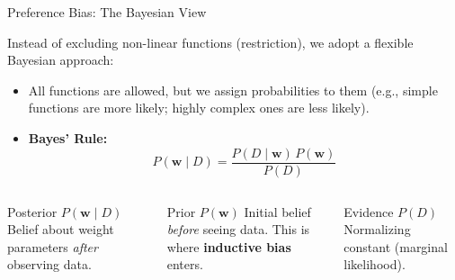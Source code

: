 \documentclass[aspectratio=169, 10pt,handout]{beamer}
\newcommand{\bw}{\mathbf{w}}
\begin{document}
\begin{frame}{Preference Bias: The Bayesian View}

  Instead of excluding non-linear functions (restriction), we adopt a flexible
  Bayesian approach:
  \begin{itemize}
    \item All functions are allowed, but we assign probabilities to them
      (e.g., simple functions are more likely; highly complex ones are less likely).
    \item \textbf{Bayes' Rule:}
      \[
        P(\bw\mid D) = \frac{P(D\mid\bw)\,P(\bw)}{P(D)}
      \]
  \end{itemize}

  \vspace{4pt}
  
  \begin{columns}[T]
      
      \begin{block}{Posterior $P(\bw\mid D)$}
        Belief about weight parameters \emph{after} observing data.
      \end{block}
      \begin{block}{Prior $P(\bw)$}
        Initial belief \emph{before} seeing data.  This is where
        \textbf{inductive bias} enters.
      \end{block}
      \begin{block}{Evidence $P(D)$}
        Normalizing constant (marginal likelihood).
      \end{block}
  \end{columns}

\end{frame}
\end{document}
